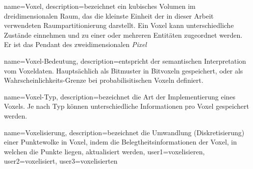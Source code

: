 {
	name=Voxel,
	description={bezeichnet ein kubisches Volumen im dreidimensionalen Raum, das die kleinste Einheit der in dieser Arbeit verwendeten Raumpartitionierung darstellt. Ein Voxel kann unterschiedliche Zustände einnehmen und zu einer oder mehreren Entitäten zugeordnet werden. Er ist das Pendant des zweidimensionalen \textit{Pixel}}
}

{
	name=Voxel-Bedeutung,
	description={entspricht der semantischen Interpretation vom Voxeldaten. Hauptsächlich als Bitmuster in Bitvoxeln gespeichert, oder als Wahrscheinlichkeits-Grenze bei probabilisitischen Voxeln definiert.}
}

{
	name=Voxel-Typ,
	description={bezeichnet die Art der Implementierung eines \Glspl{Voxel}. Je nach Typ können unterschiedliche Informationen pro Voxel gespeichert werden.}
}

{
	name=Voxelisierung,
	description={bezeichnet die Umwandlung (Diskretisierung) einer Punktewolke in Voxel, indem die Belegtheitsinformationen der Voxel, in welchen die Punkte liegen, aktualisiert werden},
	user1={voxelisieren},
	user2={voxelisiert},
	user3={voxelisierten}
}